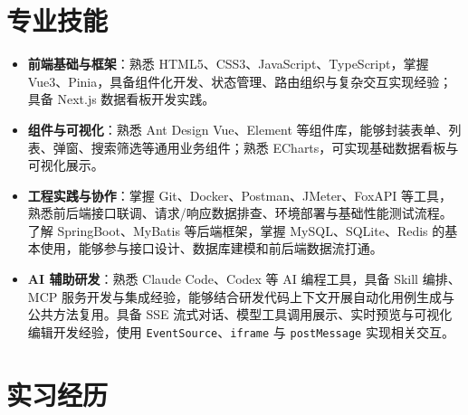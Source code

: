 \documentclass[10pt]{article}
\begin{document}
    \ResumeContactBar
    \ResumeProfileAndEducation



    \section[专业技能]{\makebox[\iconwidth][c]{\color{primarycolor}{\faWrench}}\quad 专业技能}
    \begin{itemize}
        \item \textbf{前端基础与框架}：熟悉 HTML5、CSS3、JavaScript、TypeScript，掌握 Vue3、Pinia，具备组件化开发、状态管理、路由组织与复杂交互实现经验；具备 Next.js 数据看板开发实践。
        \item \textbf{组件与可视化}：熟悉 Ant Design Vue、Element 等组件库，能够封装表单、列表、弹窗、搜索筛选等通用业务组件；熟悉 ECharts，可实现基础数据看板与可视化展示。
        \item \textbf{工程实践与协作}：掌握 Git、Docker、Postman、JMeter、FoxAPI 等工具，熟悉前后端接口联调、请求/响应数据排查、环境部署与基础性能测试流程。了解 SpringBoot、MyBatis 等后端框架，掌握 MySQL、SQLite、Redis 的基本使用，能够参与接口设计、数据库建模和前后端数据流打通。
        \item \textbf{AI 辅助研发}：熟悉 Claude Code、Codex 等 AI 编程工具，具备 Skill 编排、MCP 服务开发与集成经验，能够结合研发代码上下文开展自动化用例生成与公共方法复用。具备 SSE 流式对话、模型工具调用展示、实时预览与可视化编辑开发经验，使用 \texttt{EventSource}、\texttt{iframe} 与 \texttt{postMessage} 实现相关交互。
        
        
        
    \end{itemize}



    \section[实习经历]{\makebox[\iconwidth][c]{\color{primarycolor}{\faBriefcase}}\quad 实习经历}
\end{document}
